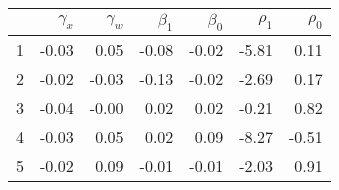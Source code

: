 \begin{tabular}{lr r r r r r}
\hline\hline
            &  $\gamma_x$&  $\gamma_w$&   $\beta_1$&   $\beta_0$&    $\rho_1$&    $\rho_0$\\
\hline
1           &       -0.03&        0.05&       -0.08&       -0.02&       -5.81&        0.11\\
2           &       -0.02&       -0.03&       -0.13&       -0.02&       -2.69&        0.17\\
3           &       -0.04&       -0.00&        0.02&        0.02&       -0.21&        0.82\\
4           &       -0.03&        0.05&        0.02&        0.09&       -8.27&       -0.51\\
5           &       -0.02&        0.09&       -0.01&       -0.01&       -2.03&        0.91\\
\hline\hline
\end{tabular}
